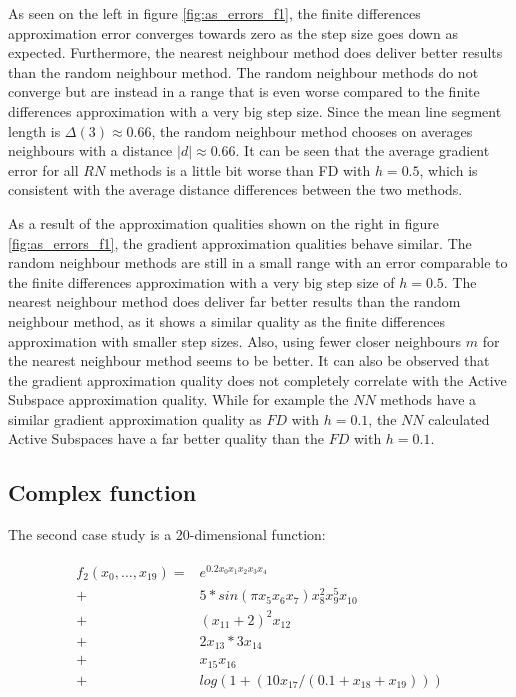 \documentclass[
  a4paper,  %
  twoside,  %
  bibliography=totoc,
  headsepline,
  cleardoublepage=empty,
  parskip=half,
  draft=false
]{scrbook}
\begin{document}
As seen on the left in figure \ref{fig:as_errors_f1}, the finite differences approximation error converges towards zero as the step size goes down as expected.
Furthermore, the nearest neighbour method does deliver better results than the random neighbour method.
The random neighbour methods do not converge but are instead in a range that is even worse compared to the finite differences approximation with a very big step size.
Since the mean line segment length is $\Delta(3) \approx 0.66$, the random neighbour method chooses on averages neighbours with a distance $|d| \approx 0.66$.
It can be seen that the average gradient error for all $RN$ methods is a little bit worse than FD with $h=0.5$, which is consistent with the average distance differences between the two methods.

As a result of the approximation qualities shown on the right in figure \ref{fig:as_errors_f1}, the gradient approximation qualities behave similar.
The random neighbour methods are still in a small range with an error comparable to the finite differences approximation with a very big step size of $h=0.5$.
The nearest neighbour method does deliver far better results than the random neighbour method, as it shows a similar quality as the finite differences approximation with smaller step sizes.
Also, using fewer closer neighbours $m$ for the nearest neighbour method seems to be better.
It can also be observed that the gradient approximation quality does not completely correlate with the Active Subspace approximation quality.
While for example the $NN$ methods have a similar gradient approximation quality as $FD$ with $h=0.1$, the $NN$ calculated Active Subspaces have a far better quality than the $FD$ with $h=0.1$.

\newpage

\subsection{Complex function}

The second case study is a 20-dimensional function:

\begin{align}
\begin{split}
f_2(x_0, \dots, x_{19})=&e^{0.2 x_0 x_1 x_2 x_3 x_4}\\
+ &5 * sin(\pi x_5 x_6 x_7) x_8^2 x_9^5 x_{10}\\
+ &(x_{11} + 2)^2 x_{12}\\
+ &2 x_{13} * 3 x_{14}\\
+ &x_{15} x_{16}\\
+ &log(1 + (10 x_{17} / (0.1 + x_{18} + x_{19})))
\end{split}
\end{align}
\end{document}
